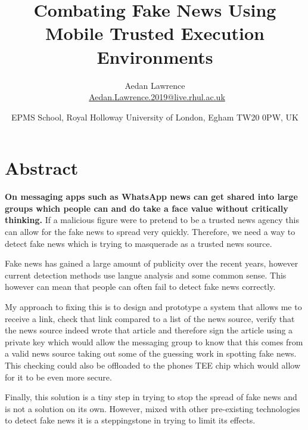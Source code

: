 \documentclass[11pt,a4paper]{report}
\author{Aedan Lawrence \\\ \href{mailto:Aedan.Lawrence.2019@live.rhul.ac.uk}{Aedan.Lawrence.2019@live.rhul.ac.uk}}
\title{Combating Fake News Using Mobile Trusted Execution Environments}
\date{EPMS School, Royal Holloway University of London, Egham TW20 0PW, UK}
\begin{document}
\maketitle
\tableofcontents
\newpage
\section{Abstract}
\textbf{On messaging apps such as WhatsApp news can get shared into large groups which people can and do take a face value without critically thinking.} If a malicious figure were to pretend to be a trusted news agency this can allow for the fake news to spread very quickly. Therefore, we need a way to detect fake news which is trying to masquerade as a trusted news source.

Fake news has gained a large amount of publicity over the recent years, however current detection methods use langue analysis and some common sense. This however can mean that people can often fail to detect fake news correctly.

My approach to fixing this is to design and prototype a system that allows me to receive a link, check that link compared to a list of the news source, verify that the news source indeed wrote that article and therefore sign the article using a private key which would allow the messaging group to know that this comes from a valid news source taking out some of the guessing work in spotting fake news. This checking could also be offloaded to the phones TEE chip which would allow for it to be even more secure.

Finally, this solution is a tiny step in trying to stop the spread of fake news and is not a solution on its own. However, mixed with other pre-existing technologies to detect fake news it is a steppingstone in trying to limit its effects. 

\newpage
\end{document}
